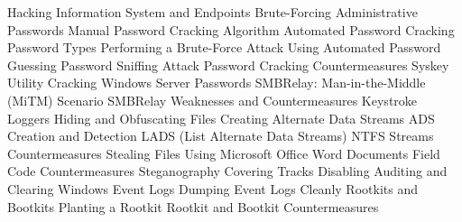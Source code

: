 Hacking Information System and Endpoints
	Brute-Forcing Administrative Passwords
	Manual Password Cracking Algorithm
	Automated Password Cracking
	Password Types
	Performing a Brute-Force Attack Using Automated Password Guessing
	Password Sniffing Attack
	Password Cracking Countermeasures
	Syskey Utility
	Cracking Windows Server Passwords
	SMBRelay: Man-in-the-Middle (MiTM) Scenario
	SMBRelay Weaknesses and Countermeasures
	Keystroke Loggers
	Hiding and Obfuscating Files
	Creating Alternate Data Streams
	ADS Creation and Detection
	LADS (List Alternate Data Streams)
	NTFS Streams Countermeasures
	Stealing Files Using Microsoft Office Word Documents
	Field Code Countermeasures
	Steganography
	Covering Tracks
	Disabling Auditing and Clearing Windows Event Logs
	Dumping Event Logs Cleanly
	Rootkits and Bootkits
		Planting a Rootkit
		Rootkit and Bootkit Countermeasures